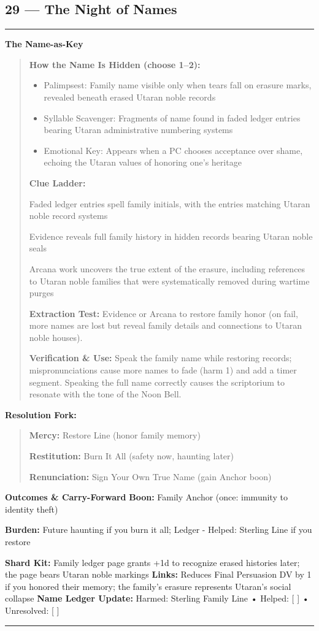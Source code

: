 \documentclass[18pt, letterpaper, twoside]{article}
\newenvironment{floorbox}[1]{%
    \begin{center}
    \begin{minipage}{0.95\textwidth}
    \subsection*{#1}
    \vspace{-0.5em}
    \rule{\textwidth}{0.5pt}
    \vspace{0.5em}
}{%
    \vspace{0.5em}
    \rule{\textwidth}{0.5pt}
    \end{minipage}
    \end{center}
}
\newenvironment{gmnote}[1]{%
    \vspace{0.5em}
    \noindent\textbf{#1}
    \begin{quote}
}{%
    \end{quote}
    \vspace{0.5em}
}
\newenvironment{resolutionbox}{%
    \vspace{0.5em}
    \noindent\textbf{Resolution Fork:}
    \begin{quote}
}{%
    \end{quote}
    \vspace{0.5em}
}
\newcommand{\boon}[1]{\noindent\textbf{Boon:} #1\par}
\newcommand{\burden}[1]{\noindent\textbf{Burden:} #1\par}
\begin{document}
\begin{floorbox}{29 --- The Night of Names}
\begin{gmnote}{The Name-as-Key}
    \textbf{How the Name Is Hidden (choose 1--2):}
    \begin{itemize}[leftmargin=*]
        \item Palimpsest: Family name visible only when tears fall on erasure marks, revealed beneath erased Utaran noble records
        \item Syllable Scavenger: Fragments of name found in faded ledger entries bearing Utaran administrative numbering systems
        \item Emotional Key: Appears when a PC chooses acceptance over shame, echoing the Utaran values of honoring one's heritage
    \end{itemize}
    
    \textbf{Clue Ladder:}
    \begin{description}[leftmargin=*, style=unboxed]
        \item[Gentle Nudge:] Faded ledger entries spell family initials, with the entries matching Utaran noble record systems
        \item[Actionable Lead:] Evidence reveals full family history in hidden records bearing Utaran noble seals
        \item[Aha! Proof:] Arcana work uncovers the true extent of the erasure, including references to Utaran noble families that were systematically removed during wartime purges
    \end{description}
    
    \textbf{Extraction Test:} Evidence or Arcana to restore family honor (on fail, more names are lost but reveal family details and connections to Utaran noble houses).
    
    \textbf{Verification \& Use:} Speak the family name while restoring records; mispronunciations cause more names to fade (harm 1) and add a timer segment. Speaking the full name correctly causes the scriptorium to resonate with the tone of the Noon Bell.
    \end{gmnote}
    
    \begin{resolutionbox}
    \textbf{Mercy:} Restore Line (honor family memory)
    
    \textbf{Restitution:} Burn It All (safety now, haunting later)
    
    \textbf{Renunciation:} Sign Your Own True Name (gain Anchor boon)
    \end{resolutionbox}
    
    \textbf{Outcomes \& Carry-Forward}
    \boon{Family Anchor (once: immunity to identity theft)}
    \burden{Future haunting if you burn it all; Ledger - Helped: Sterling Line if you restore}
    \textbf{Shard Kit:} Family ledger page grants +1d to recognize erased histories later; the page bears Utaran noble markings
    \textbf{Links:} Reduces Final Persuasion DV by 1 if you honored their memory; the family's erasure represents Utaran's social collapse
    \textbf{Name Ledger Update:} Harmed: Sterling Family Line • Helped: [ ] • Unresolved: [ ]
    

\end{floorbox}
\end{document}
